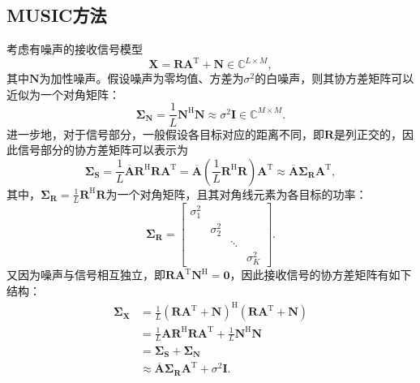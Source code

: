 \subsection{MUSIC方法}
考虑有噪声的接收信号模型
\[
    \mathbf{X} = \mathbf{R} \mathbf{A}^{\mathrm{T}} + \mathbf{N} \in \mathbb{C}^{L \times M},
\]
其中\( \mathbf{N} \)为加性噪声。假设噪声为零均值、方差为\( \sigma^2 \)的白噪声，则其协方差矩阵可以近似为一个对角矩阵：
\[
    \mathbf{\Sigma}_{\mathbf{N}} = \frac{1}{L} \mathbf{N}^{\mathrm{H}} \mathbf{N} \approx \sigma^2 \mathbf{I} \in \mathbb{C}^{M \times M}.
\]
进一步地，对于信号部分，一般假设各目标对应的距离不同，即\( \mathbf{R} \)是列正交的，因此信号部分的协方差矩阵可以表示为
\[
    \mathbf{\Sigma}_{\mathbf{S}} = \frac{1}{L} \overline{\mathbf{A}} \mathbf{R}^{\mathrm{H}} \mathbf{R} \mathbf{A}^{\mathrm{T}} = \overline{\mathbf{A}}  \left( \frac{1}{L} \mathbf{R}^{\mathrm{H}} \mathbf{R} \right) \mathbf{A}^{\mathrm{T}} \approx \overline{\mathbf{A}} \mathbf{\Sigma}_{\mathbf{R}} \mathbf{A}^{\mathrm{T}},
\]
其中，\( \mathbf{\Sigma}_{\mathbf{R}} = \frac{1}{L} \mathbf{R}^{\mathrm{H}} \mathbf{R} \)为一个对角矩阵，且其对角线元素为各目标的功率：
\[
    \mathbf{\Sigma}_{\mathbf{R}} = \begin{bmatrix}
        \sigma_1^2 &            &        &            \\
                   & \sigma_2^2 &        &            \\
                   &            & \ddots &            \\
                   &            &        & \sigma_K^2
    \end{bmatrix}.
\]
又因为噪声与信号相互独立，即\( \mathbf{R}\mathbf{A}^{\mathrm{T}} \mathbf{N}^{\mathrm{H}} = \mathbf{0} \)，因此接收信号的协方差矩阵有如下结构：
\[
    \begin{split}
        \mathbf{\Sigma}_{\mathbf{X}} & = \frac{1}{L} \left( \mathbf{R} \mathbf{A}^{\mathrm{T}} + \mathbf{N} \right)^{\mathrm{H}} \left( \mathbf{R} \mathbf{A}^{\mathrm{T}} + \mathbf{N} \right) \\
                                     & = \frac{1}{L} \mathbf{A} \mathbf{R}^{\mathrm{H}} \mathbf{R} \mathbf{A}^{\mathrm{T}} + \frac{1}{L} \mathbf{N}^{\mathrm{H}} \mathbf{N}                     \\
                                     & = \mathbf{\Sigma}_{\mathbf{S}} + \mathbf{\Sigma}_{\mathbf{N}}                                                                                            \\
                                     & \approx \overline{\mathbf{A}} \mathbf{\Sigma}_{\mathbf{R}} \mathbf{A}^{\mathrm{T}} + \sigma^2 \mathbf{I}.
    \end{split}
\]

